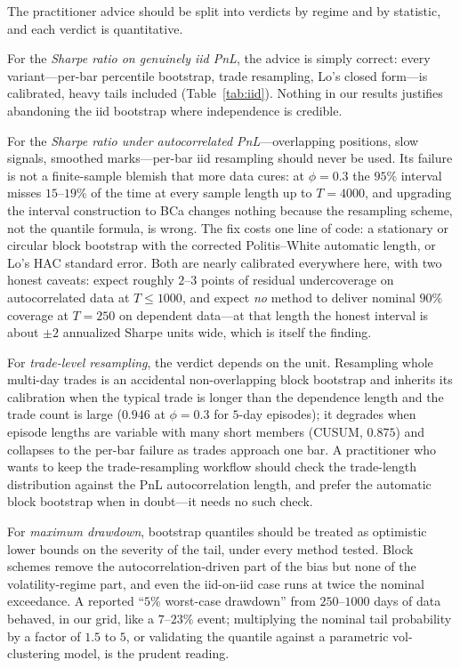\documentclass[11pt]{article}
\begin{document}
The practitioner advice should be split into verdicts by regime and by
statistic, and each verdict is quantitative.

For the \emph{Sharpe ratio on genuinely iid PnL}, the advice is simply
correct: every variant---per-bar percentile bootstrap, trade resampling,
Lo's closed form---is calibrated, heavy tails included
(Table~\ref{tab:iid}). Nothing in our results justifies abandoning the iid
bootstrap where independence is credible.

For the \emph{Sharpe ratio under autocorrelated PnL}---overlapping positions,
slow signals, smoothed marks---per-bar iid resampling should never be used.
Its failure is not a finite-sample blemish that more data cures: at
$\phi=0.3$ the $95\%$ interval misses $15$--$19\%$ of the time at every
sample length up to $T=4000$, and upgrading the interval construction to BCa
changes nothing because the resampling scheme, not the quantile formula, is
wrong. The fix costs one line of code: a stationary or circular block
bootstrap with the corrected Politis--White automatic length, or Lo's HAC
standard error. Both are nearly calibrated everywhere here, with two honest
caveats: expect roughly $2$--$3$ points of residual undercoverage on
autocorrelated data at $T\le1000$, and expect \emph{no} method to deliver
nominal $90\%$ coverage at $T=250$ on dependent data---at that length the
honest interval is about $\pm2$ annualized Sharpe units wide, which is itself
the finding.

For \emph{trade-level resampling}, the verdict depends on the unit. Resampling
whole multi-day trades is an accidental non-overlapping block bootstrap and
inherits its calibration when the typical trade is longer than the dependence
length and the trade count is large ($0.946$ at $\phi=0.3$ for $5$-day
episodes); it degrades when episode lengths are variable with many short
members (CUSUM, $0.875$) and collapses to the per-bar failure as trades
approach one bar. A practitioner who wants to keep the trade-resampling
workflow should check the trade-length distribution against the PnL
autocorrelation length, and prefer the automatic block bootstrap when in
doubt---it needs no such check.

For \emph{maximum drawdown}, bootstrap quantiles should be treated as
optimistic lower bounds on the severity of the tail, under every method
tested. Block schemes remove the autocorrelation-driven part of the bias but
none of the volatility-regime part, and even the iid-on-iid case runs at twice
the nominal exceedance. A reported ``$5\%$ worst-case drawdown'' from $250$--$1000$
days of data behaved, in our grid, like a $7$--$23\%$ event; multiplying the
nominal tail probability by a factor of $1.5$ to $5$, or validating the
quantile against a parametric vol-clustering model, is the prudent reading.
\end{document}
